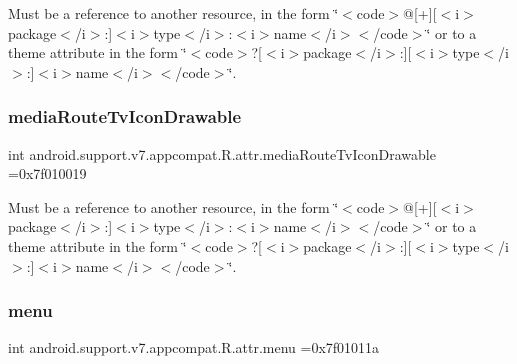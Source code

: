 Must be a reference to another resource, in the form \char`\"{}$<$code$>$@\mbox{[}+\mbox{]}\mbox{[}$<$i$>$package$<$/i$>$\+:\mbox{]}$<$i$>$type$<$/i$>$\+:$<$i$>$name$<$/i$>$$<$/code$>$\char`\"{} or to a theme attribute in the form \char`\"{}$<$code$>$?\mbox{[}$<$i$>$package$<$/i$>$\+:\mbox{]}\mbox{[}$<$i$>$type$<$/i$>$\+:\mbox{]}$<$i$>$name$<$/i$>$$<$/code$>$\char`\"{}. \mbox{\label{classandroid_1_1support_1_1v7_1_1appcompat_1_1R_1_1attr_a0221ccb0a2c02fa6f266419c891e5dc0}} 
\subsubsection{\texorpdfstring{media\+Route\+Tv\+Icon\+Drawable}{mediaRouteTvIconDrawable}}
{\footnotesize\ttfamily int android.\+support.\+v7.\+appcompat.\+R.\+attr.\+media\+Route\+Tv\+Icon\+Drawable =0x7f010019\hspace{0.3cm}{\ttfamily [static]}}

Must be a reference to another resource, in the form \char`\"{}$<$code$>$@\mbox{[}+\mbox{]}\mbox{[}$<$i$>$package$<$/i$>$\+:\mbox{]}$<$i$>$type$<$/i$>$\+:$<$i$>$name$<$/i$>$$<$/code$>$\char`\"{} or to a theme attribute in the form \char`\"{}$<$code$>$?\mbox{[}$<$i$>$package$<$/i$>$\+:\mbox{]}\mbox{[}$<$i$>$type$<$/i$>$\+:\mbox{]}$<$i$>$name$<$/i$>$$<$/code$>$\char`\"{}. \mbox{\label{classandroid_1_1support_1_1v7_1_1appcompat_1_1R_1_1attr_ad3871796a0d29974680c8d438612fa54}} 
\subsubsection{\texorpdfstring{menu}{menu}}
{\footnotesize\ttfamily int android.\+support.\+v7.\+appcompat.\+R.\+attr.\+menu =0x7f01011a\hspace{0.3cm}{\ttfamily [static]}}

